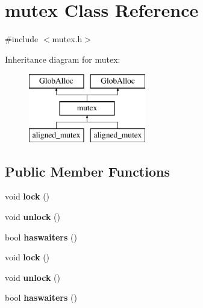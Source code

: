 \hypertarget{classmutex}{\section{mutex Class Reference}
\label{classmutex}
}


{\ttfamily \#include $<$mutex.\-h$>$}

Inheritance diagram for mutex\-:\begin{figure}[H]
\begin{center}
\leavevmode
\includegraphics[height=3.000000cm]{classmutex}
\end{center}
\end{figure}
\subsection*{Public Member Functions}
\begin{DoxyCompactItemize}
\item 
\hypertarget{classmutex_a760ba333c299e9b27730051c4c794f50}{void {\bfseries lock} ()}\label{classmutex_a760ba333c299e9b27730051c4c794f50}

\item 
\hypertarget{classmutex_a362d78bead80c2899d89444380cab1bd}{void {\bfseries unlock} ()}\label{classmutex_a362d78bead80c2899d89444380cab1bd}

\item 
\hypertarget{classmutex_a09140b0a6ad0f54e63056a3393c93a81}{bool {\bfseries haswaiters} ()}\label{classmutex_a09140b0a6ad0f54e63056a3393c93a81}

\item 
\hypertarget{classmutex_a760ba333c299e9b27730051c4c794f50}{void {\bfseries lock} ()}\label{classmutex_a760ba333c299e9b27730051c4c794f50}

\item 
\hypertarget{classmutex_a362d78bead80c2899d89444380cab1bd}{void {\bfseries unlock} ()}\label{classmutex_a362d78bead80c2899d89444380cab1bd}

\item 
\hypertarget{classmutex_a09140b0a6ad0f54e63056a3393c93a81}{bool {\bfseries haswaiters} ()}\label{classmutex_a09140b0a6ad0f54e63056a3393c93a81}

\end{DoxyCompactItemize}


